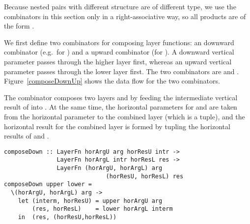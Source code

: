 \documentclass[preprint,natbib]{sigplanconf}
\begin{document}
\bc Because nested pairs with different structure are of different type, we use the combinators in this section only in a right-associative way, so all products are of the form . 
\ec

We first define two combinators for composing layer functions: an downward combinator (e.g.\ for ) and a upward combinator (for ). A downward vertical parameter passes through the higher layer first, whereas an upward vertical parameter passes through the lower layer first. The two combinators are  and . Figure~\ref{composeDownUp} shows the data flow for the two combinators. 

The combinator  composes two layers  and  by feeding the intermediate vertical result of  into . At the same time, the horizontal parameters for  and  are taken from the horizontal parameter to the combined layer (which is a tuple), and the horizontal result for the combined layer is formed by tupling the horizontal results of  and . 

\begin{small}
\begin{verbatim}
composeDown :: LayerFn horArgU arg horResU intr ->
               LayerFn horArgL intr horResL res ->
               LayerFn (horArgU, horArgL) arg 
                             (horResU, horResL) res
composeDown upper lower = 
  \(horArgU, horArgL) arg ->                                           
    let (interm, horResU) = upper horArgU arg
        (res, horResL)    = lower horArgL interm            
    in  (res, (horResU,horResL))
\end{verbatim}
\end{small}
\end{document}
